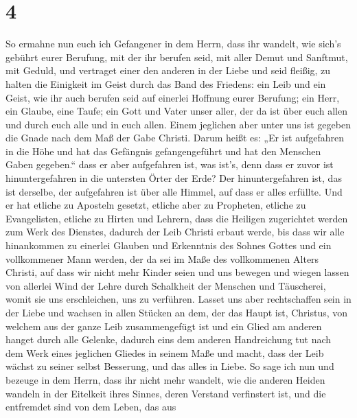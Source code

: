 \hypertarget{section-3}{%
\section{4}\label{section-3}}

 So ermahne nun euch ich Gefangener in dem Herrn, dass ihr
wandelt, wie sich's gebührt eurer Berufung, mit der ihr berufen seid,
 mit aller Demut und Sanftmut, mit Geduld, und vertraget
einer den anderen in der Liebe  und seid fleißig, zu
halten die Einigkeit im Geist durch das Band des Friedens:
 ein Leib und ein Geist, wie ihr auch berufen seid auf
einerlei Hoffnung eurer Berufung;  ein Herr, ein Glaube,
eine Taufe;  ein Gott und Vater unser aller, der da ist
über euch allen und durch euch alle und in euch allen. 
Einem jeglichen aber unter uns ist gegeben die Gnade nach dem Maß der
Gabe Christi.  Darum heißt es: „Er ist aufgefahren in die
Höhe und hat das Gefängnis gefangengeführt und hat den Menschen Gaben
gegeben.``  dass er aber aufgefahren ist, was ist's, denn
dass er zuvor ist hinuntergefahren in die untersten Örter der Erde?
 Der hinuntergefahren ist, das ist derselbe, der
aufgefahren ist über alle Himmel, auf dass er alles erfüllte.
 Und er hat etliche zu Aposteln gesetzt, etliche aber zu
Propheten, etliche zu Evangelisten, etliche zu Hirten und Lehrern,
 dass die Heiligen zugerichtet werden zum Werk des
Dienstes, dadurch der Leib Christi erbaut werde,  bis
dass wir alle hinankommen zu einerlei Glauben und Erkenntnis des Sohnes
Gottes und ein vollkommener Mann werden, der da sei im Maße des
vollkommenen Alters Christi,  auf dass wir nicht mehr
Kinder seien und uns bewegen und wiegen lassen von allerlei Wind der
Lehre durch Schalkheit der Menschen und Täuscherei, womit sie uns
erschleichen, uns zu verführen.  Lasset uns aber
rechtschaffen sein in der Liebe und wachsen in allen Stücken an dem, der
das Haupt ist, Christus,  von welchem aus der ganze Leib
zusammengefügt ist und ein Glied am anderen hanget durch alle Gelenke,
dadurch eins dem anderen Handreichung tut nach dem Werk eines jeglichen
Gliedes in seinem Maße und macht, dass der Leib wächst zu seiner selbst
Besserung, und das alles in Liebe.  So sage ich nun und
bezeuge in dem Herrn, dass ihr nicht mehr wandelt, wie die anderen
Heiden wandeln in der Eitelkeit ihres Sinnes,  deren
Verstand verfinstert ist, und die entfremdet sind von dem Leben, das aus
